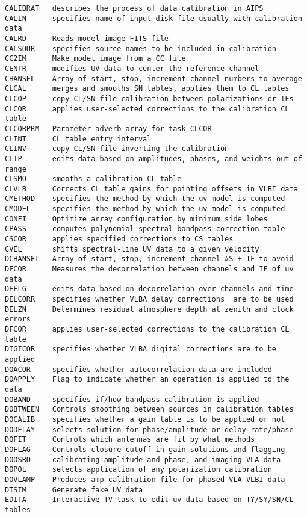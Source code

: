 \begin{verbatim}
CALIBRAT   describes the process of data calibration in AIPS
CALIN      specifies name of input disk file usually with calibration data
CALRD      Reads model-image FITS file
CALSOUR    specifies source names to be included in calibration
CC2IM      Make model image from a CC file
CENTR      modifies UV data to center the reference channel
CHANSEL    Array of start, stop, increment channel numbers to average
CLCAL      merges and smooths SN tables, applies them to CL tables
CLCOP      copy CL/SN file calibration between polarizations or IFs
CLCOR      applies user-selected corrections to the calibration CL table
CLCORPRM   Parameter adverb array for task CLCOR
CLINT      CL table entry interval
CLINV      copy CL/SN file inverting the calibration
CLIP       edits data based on amplitudes, phases, and weights out of range
CLSMO      smooths a calibration CL table
CLVLB      Corrects CL table gains for pointing offsets in VLBI data
CMETHOD    specifies the method by which the uv model is computed
CMODEL     specifies the method by which the uv model is computed
CONFI      Optimize array configuration by minimum side lobes
CPASS      computes polynomial spectral bandpass correction table
CSCOR      applies specified corrections to CS tables
CVEL       shifts spectral-line UV data to a given velocity
DCHANSEL   Array of start, stop, increment channel #S + IF to avoid
DECOR      Measures the decorrelation between channels and IF of uv data
DEFLG      edits data based on decorrelation over channels and time
DELCORR    specifies whether VLBA delay corrections  are to be used
DELZN      Determines residual atmosphere depth at zenith and clock errors
DFCOR      applies user-selected corrections to the calibration CL table
DIGICOR    specifies whether VLBA digital corrections are to be applied
DOACOR     specifies whether autocorrelation data are included
DOAPPLY    Flag to indicate whether an operation is applied to the data
DOBAND     specifies if/how bandpass calibration is applied
DOBTWEEN   Controls smoothing between sources in calibration tables
DOCALIB    specifies whether a gain table is to be applied or not
DODELAY    selects solution for phase/amplitude or delay rate/phase
DOFIT      Controls which antennas are fit by what methods
DOFLAG     Controls closure cutoff in gain solutions and flagging
DOOSRO     calibrating amplitude and phase, and imaging VLA data
DOPOL      selects application of any polarization calibration
DOVLAMP    Produces amp calibration file for phased-VLA VLBI data
DTSIM      Generate fake UV data
EDITA      Interactive TV task to edit uv data based on TY/SY/SN/CL tables

\end{verbatim}
